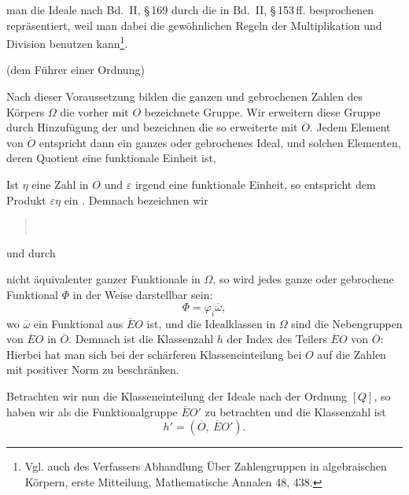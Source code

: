 
man die Ideale nach Bd.~II, \S\,169 durch die in Bd.~II, \S\,153\,ff. besprochenen  repräsentiert, weil man dabei die gewöhnlichen Regeln der Multiplikation und Division benutzen kann\footnote{Vgl. auch des Verfassers Abhandlung \glqq Über Zahlengruppen in algebraischen Körpern\grqq{}, erste Mitteilung, Mathematische Annalen 48, 438.}.

 (dem Führer einer Ordnung) 

Nach dieser Voraussetzung bilden die ganzen und gebrochenen Zahlen des Körpers $\Omega$ die vorher mit $O$ bezeichnete Gruppe. Wir erweitern diese Gruppe durch Hinzufügung der  und bezeichnen die so erweiterte  mit $\overline{O}$. Jedem Element von $\overline{O}$ entspricht dann ein ganzes oder gebrochenes Ideal, und solchen Elementen, deren Quotient eine funktionale Einheit ist, 

Ist $\eta$ eine Zahl in $O$ und $\varepsilon$ irgend eine funktionale Einheit, so entspricht dem Produkt $\varepsilon\eta$ ein . Demnach bezeichnen wir
\begin{quote}
\\
\end{quote}
und durch
\begin{quote}
\end{quote}
nicht äquivalenter ganzer Funktionale in $\Omega$, so wird jedes ganze oder gebrochene Funktional $\Phi$ in der Weise darstellbar sein:
\[
\Phi = \varphi_i \overline{\omega},
\]
wo $\overline{\omega}$ ein Funktional aus $\overline{E}O$ ist, und die Idealklassen in $\Omega$ sind die Nebengruppen von $\overline{E}O$ in $\overline{O}$. Demnach ist die Klassenzahl $h$ der Index des Teilers $\overline{E}O$ von $\overline{O}$:
Hierbei hat man sich bei der schärferen Klasseneinteilung bei $O$ auf die Zahlen mit positiver Norm zu beschränken.

Betrachten wir nun die Klasseneinteilung der Ideale nach der Ordnung $[Q]$, so haben wir als  die Funktionalgruppe $\overline{E}O'$ zu betrachten und die Klassenzahl ist
\[
h' = (\overline{O},\ \overline{E}O').
\]
